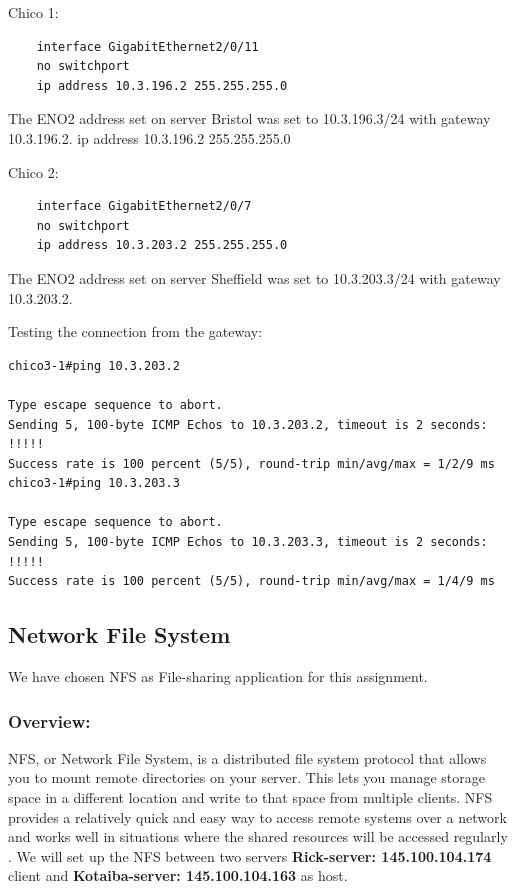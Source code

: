 \documentclass[10pt,a4paper]{article}
\begin{document}
Chico 1:
\begin{verbatim}
    interface GigabitEthernet2/0/11
    no switchport
    ip address 10.3.196.2 255.255.255.0
\end{verbatim}

The ENO2 address set on server Bristol was set to 10.3.196.3/24 with gateway 10.3.196.2. 
ip address 10.3.196.2 255.255.255.0

Chico 2:
\begin{verbatim}
    interface GigabitEthernet2/0/7
    no switchport
    ip address 10.3.203.2 255.255.255.0
\end{verbatim}

The ENO2 address set on server Sheffield was set to 10.3.203.3/24 with gateway 10.3.203.2.

Testing the connection from the gateway:
\begin{verbatim}
chico3-1#ping 10.3.203.2

Type escape sequence to abort.
Sending 5, 100-byte ICMP Echos to 10.3.203.2, timeout is 2 seconds:
!!!!!
Success rate is 100 percent (5/5), round-trip min/avg/max = 1/2/9 ms
chico3-1#ping 10.3.203.3

Type escape sequence to abort.
Sending 5, 100-byte ICMP Echos to 10.3.203.3, timeout is 2 seconds:
!!!!!
Success rate is 100 percent (5/5), round-trip min/avg/max = 1/4/9 ms
\end{verbatim}


\subsection{Network File System}

We have chosen NFS as File-sharing application for this assignment. 

\subsubsection{Overview:}
NFS, or Network File System, is a distributed file system protocol that allows you to mount remote directories on your server. This lets you manage storage space in a different location and write to that space from multiple clients. NFS provides a relatively quick and easy way to access remote systems over a network and works well in situations where the shared resources will be accessed regularly \cite{NFS}. We will set up the NFS between two servers \textbf{Rick-server: 145.100.104.174} client and \textbf{Kotaiba-server: 145.100.104.163} as host. %
\end{document}
